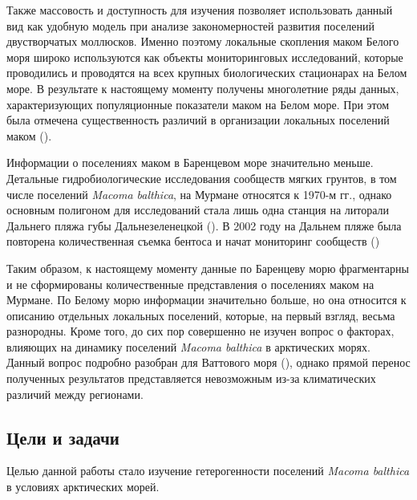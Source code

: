 Также массовость и доступность для изучения позволяет использовать данный вид как удобную модель при анализе закономерностей развития поселений двустворчатых моллюсков. 
Именно поэтому локальные скопления маком Белого моря широко используются как объекты мониторинговых исследований, которые проводились и проводятся на всех крупных биологических стационарах на Белом море. 
В результате к настоящему моменту получены многолетние ряды данных, характеризующих  популяционные показатели маком на Белом море. 
При этом была отмечена существенность различий в организации локальных поселений маком (\cite{Semenova_1974, Maximovich_Kunina_1982, Maximovich_et_al_1991, Poloskin_1996, Nikolaeva_1998, Nazarova_2003, Nazarova_Poloskin_2005}).
 
Информации о поселениях маком в Баренцевом море значительно меньше. 
Детальные гидробиологические исследования сообществ мягких грунтов, в том числе  поселений {\it Macoma balthica}, на Мурмане относятся к 1970-м гг., однако основным полигоном для исследований стала лишь одна станция на литорали Дальнего пляжа губы Дальнезеленецкой (\cite{Agarova_et_al_1976}).
В 2002 году на Дальнем пляже была повторена количественная съемка бентоса и начат мониторинг сообществ (\cite{Genelt_Dalnezeleneckaya_2008})

Таким образом, к настоящему моменту данные по Баренцеву морю фрагментарны и не сформированы количественные представления о поселениях маком на Мурмане. 
По Белому морю информации значительно больше, но она относится к описанию отдельных локальных поселений, которые, на первый взгляд, весьма разнородны. 
Кроме того, до сих пор совершенно не изучен вопрос о факторах, влияющих на динамику поселений {\it Macoma balthica} в арктических морях. 
Данный вопрос подробно разобран для Ваттового моря (\cite{Hiddink_et_al_2002_predation_epifauna, Hiddink_et_al_2002_predation_infauna, Beukema_et_al_2009}), однако прямой перенос полученных результатов представляется невозможным из-за климатических различий между регионами.


\subsection{Цели и задачи}
Целью данной работы стало изучение гетерогенности поселений {\it Macoma balthica} в условиях арктических морей.

